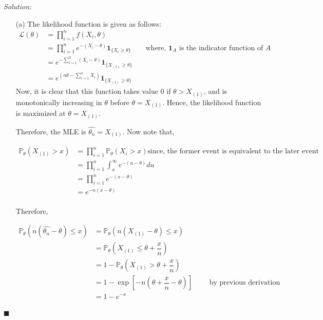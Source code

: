 \documentclass[12pt]{article}
\newcommand{\prob}{\mathbb{P}}
\theoremstyle{definition}
\newenvironment{answer}{\textit{Solution: }\quad }{ \hfill $\blacksquare$}
\numberwithin{equation}{section}
\begin{document}
\begin{answer}
	\begin{enumerate}
        \item[(a)] The likelihood function is given as follows:
        \begin{align*}
            \mathcal{L}(\theta) 
            & = \prod_{i=1}^{n} f(X_i, \theta)\\
            & = \prod_{i=1}^{n} e^{-(X_i - \theta)} \bm{1}_{\{ X_i \geq \theta\} }\qquad \text{where, } \bm{1}_A \text{ is the indicator function of } A\\
            & = e^{-\sum_{i=1}^{n} (X_i - \theta) } \bm{1}_{ \{X_{(1)} \geq \theta\} }\\
            & = e^{(n\theta - \sum_{i=1}^{n} X_i)} \bm{1}_{ \{X_{(1)} \geq \theta\} }
        \end{align*}
        Now, it is clear that this function takes value $0$ if $\theta > X_{(1)}$, and is monotonically increasing in $\theta$ before $\theta = X_{(1)}$. Hence, the likelihood function is maximized at $\theta = X_{(1)}$.

        Therefore, the MLE is $\widehat{\theta_n} = X_{(1)}$. Now note that,

        \begin{align*}
            \prob_\theta(X_{(1)} > x)
            & = \prod_{i=1}^{n} \prob_\theta(X_i > x) \text{since, the former event is equivalent to the later event}\\
            & = \prod_{i=1}^{n} \int_{x}^{\infty} e^{-(u - \theta)}du\\
            & = \prod_{i=1}^{n} e^{-(x - \theta)}\\
            & = e^{-n(x - \theta)}\\
        \end{align*}

        Therefore,

        \begin{align*}
            \prob_\theta(n(\widehat{\theta_n} - \theta) \leq x)
            & = \prob_\theta(n(X_{(1)} - \theta) \leq x)\\
            & = \prob_\theta\left(X_{(1)} \leq \theta + \dfrac{x}{n}\right)\\
            & = 1 - \prob_\theta\left( X_{(1)} > \theta + \dfrac{x}{n} \right)\\
            & = 1 - \exp\left[ -n\left( \theta + \dfrac{x}{n} - \theta \right)\right] \qquad \text{ by previous derivation}\\
            & = 1 - e^{-x}
        \end{align*}


\end{enumerate}
\end{answer}
\end{document}

